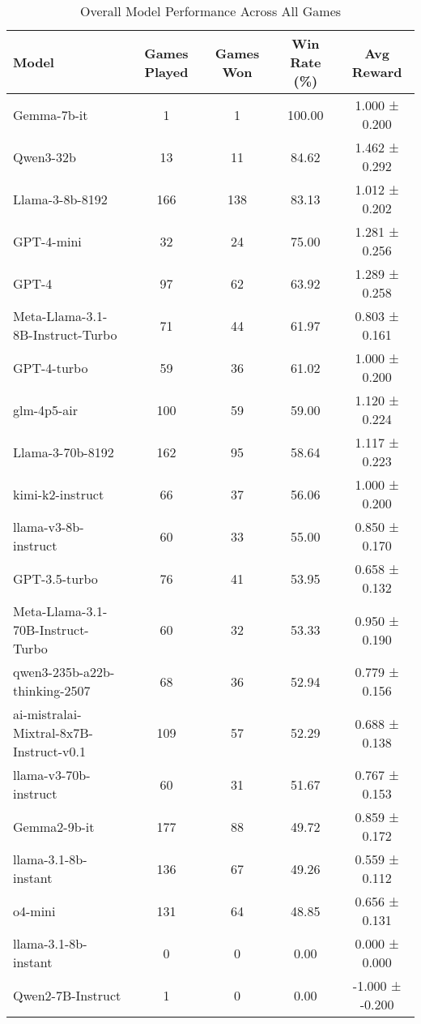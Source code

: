 \begin{table}[htbp]
\centering
\caption{Overall Model Performance Across All Games}
\begin{tabular}{lcccc}
\toprule
Model & Games Played & Games Won & Win Rate (\%) & Avg Reward \\
\midrule
Gemma-7b-it & 1 & 1 & 100.00 & 1.000 ± 0.200 \\
Qwen3-32b & 13 & 11 & 84.62 & 1.462 ± 0.292 \\
Llama-3-8b-8192 & 166 & 138 & 83.13 & 1.012 ± 0.202 \\
GPT-4-mini & 32 & 24 & 75.00 & 1.281 ± 0.256 \\
GPT-4 & 97 & 62 & 63.92 & 1.289 ± 0.258 \\
Meta-Llama-3.1-8B-Instruct-Turbo & 71 & 44 & 61.97 & 0.803 ± 0.161 \\
GPT-4-turbo & 59 & 36 & 61.02 & 1.000 ± 0.200 \\
glm-4p5-air & 100 & 59 & 59.00 & 1.120 ± 0.224 \\
Llama-3-70b-8192 & 162 & 95 & 58.64 & 1.117 ± 0.223 \\
kimi-k2-instruct & 66 & 37 & 56.06 & 1.000 ± 0.200 \\
llama-v3-8b-instruct & 60 & 33 & 55.00 & 0.850 ± 0.170 \\
GPT-3.5-turbo & 76 & 41 & 53.95 & 0.658 ± 0.132 \\
Meta-Llama-3.1-70B-Instruct-Turbo & 60 & 32 & 53.33 & 0.950 ± 0.190 \\
qwen3-235b-a22b-thinking-2507 & 68 & 36 & 52.94 & 0.779 ± 0.156 \\
ai-mistralai-Mixtral-8x7B-Instruct-v0.1 & 109 & 57 & 52.29 & 0.688 ± 0.138 \\
llama-v3-70b-instruct & 60 & 31 & 51.67 & 0.767 ± 0.153 \\
Gemma2-9b-it & 177 & 88 & 49.72 & 0.859 ± 0.172 \\
llama-3.1-8b-instant & 136 & 67 & 49.26 & 0.559 ± 0.112 \\
o4-mini & 131 & 64 & 48.85 & 0.656 ± 0.131 \\
llama-3.1-8b-instant & 0 & 0 & 0.00 & 0.000 ± 0.000 \\
Qwen2-7B-Instruct & 1 & 0 & 0.00 & -1.000 ± -0.200 \\
\bottomrule
\end{tabular}
\end{table}
